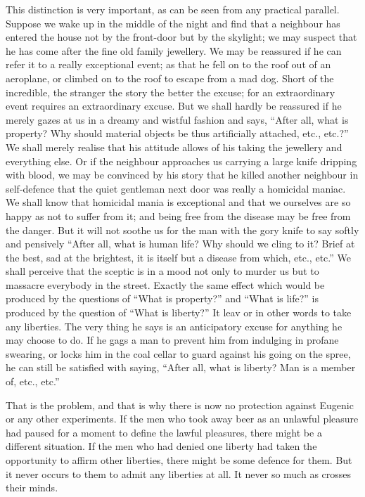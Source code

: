 \documentclass{book}
\begin{document}
This distinction is very important, as can be seen from any practical parallel. Suppose we wake up in the middle of the night and find that a neighbour has entered the house not by the front-door but by the skylight; we may suspect that he has come after the fine old family jewellery. We may be reassured if he can refer it to a really exceptional event; as that he fell on to the roof out of an aeroplane, or climbed on to the roof to escape from a mad dog. Short of the incredible, the stranger the story the better the excuse; for an extraordinary event requires an extraordinary excuse. But we shall hardly be reassured if he merely gazes at us in a dreamy and wistful fashion and says, “After all, what is property? Why should material objects be thus artificially attached, etc., etc.?” We shall merely realise that his attitude allows of his taking the jewellery and everything else. Or if the neighbour approaches us carrying a large knife dripping with blood, we may be convinced by his story that he killed another neighbour in self-defence that the quiet gentleman next door was really a homicidal maniac. We shall know that homicidal mania is exceptional and that we ourselves are so happy as not to suffer from it; and being free from the disease may be free from the danger. But it will not soothe us for the man with the gory knife to say softly and pensively “After all, what is human life? Why should we cling to it? Brief at the best, sad at the brightest, it is itself but a disease from which, etc., etc.” We shall perceive that the sceptic is in a mood not only to murder us but to massacre everybody in the street. Exactly the same effect which would be produced by the questions of “What is property?” and “What is life?” is produced by the question of “What is liberty?” It leav or in other words to take any liberties. The very thing he says is an anticipatory excuse for anything he may choose to do. If he gags a man to prevent him from indulging in profane swearing, or locks him in the coal cellar to guard against his going on the spree, he can still be satisfied with saying, “After all, what is liberty? Man is a member of, etc., etc.”

That is the problem, and that is why there is now no protection against Eugenic or any other experiments. If the men who took away beer as an unlawful pleasure had paused for a moment to define the lawful pleasures, there might be a different situation. If the men who had denied one liberty had taken the opportunity to affirm other liberties, there might be some defence for them. But it never occurs to them to admit any liberties at all. It never so much as crosses their minds.
\end{document}

